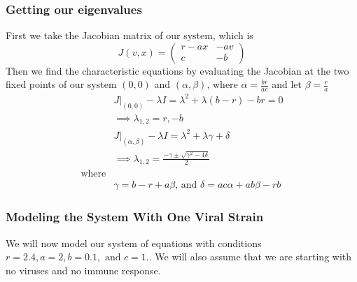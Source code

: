 \documentclass{article}
\begin{document}
\subsubsection{Getting our eigenvalues}
First we take the Jacobian matrix of our system, which is
\begin{equation}
    J(v,x) =
    \begin{pmatrix}
        r-ax    & -av \\
        c       & -b
    \end{pmatrix}
\end{equation}
Then we find the characteristic equations by evaluating the Jacobian at the two fixed points of our system $(0,0)$ and $(\alpha,\beta)$, where $\alpha = \frac{br}{ac} $ and let $\beta = \frac{r}{a} $
\begin{equation}
    \begin{split}
        &J|_{(0,0)} - \lambda I = \lambda^2 + \lambda(b-r) -br = 0\\
        &\implies \lambda_{1,2} = r,-b\\
        &J|_{(\alpha,\beta)}  - \lambda I =  \lambda^2 + \lambda \gamma + \delta\\ 
        &\implies \lambda_{1,2} = \frac{-\gamma \pm \sqrt{\gamma^2 - 4\delta}}{2} \\
        \text{where} \\
        &\gamma =  b - r + a\beta \text{, and } \delta = ac\alpha + ab\beta -rb
    \end{split}
\end{equation}
\subsubsection{Modeling the System With One Viral Strain}
We will now model our system of equations with conditions $r = 2.4, a = 2, b = 0.1, \text{ and }c = 1.$. We will also assume that we are starting with no viruses and no immune response.
\label{sub:modeling the sytem}
\end{document}
